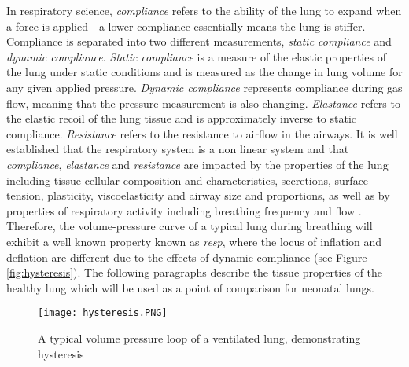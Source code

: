 \documentclass[12pt, openany, oneside]{book}
\begin{document}
In respiratory science, \textit{compliance} refers to the ability of the lung to expand when a force is applied - a lower compliance essentially means the lung is stiffer. Compliance is separated into two different measurements, \textit{static compliance} and \textit{dynamic compliance}. \textit{Static compliance} is a measure of the elastic properties of the lung under static conditions and is measured as the change in lung volume for any given applied pressure. \textit{Dynamic compliance} represents compliance during gas flow, meaning that the pressure measurement is also changing. \textit{Elastance} refers to the elastic recoil of the lung tissue and is approximately inverse to static compliance. \textit{Resistance} refers to the resistance to airflow in the airways. It is well established that the respiratory system is a non linear system and that \textit{compliance}, \textit{elastance} and \textit{resistance} are impacted by the properties of the lung including tissue cellular composition and characteristics, secretions, surface tension, plasticity, viscoelasticity and airway size and proportions, as well as by properties of respiratory activity including breathing frequency and flow \citep{sivieri, respShade, measure}. Therefore, the volume-pressure curve of a typical lung during breathing will exhibit a well known property known as \textit{resp}, where the locus of inflation and deflation are different due to the effects of dynamic compliance (see Figure \ref{fig:hysteresis}). The following paragraphs describe the tissue properties of the healthy lung which will be used as a point of comparison for neonatal lungs.\\


\begin{figure}
	\centering		
	\texttt{[image: hysteresis.PNG]}	
	\caption[Lung hysteresis]{A typical volume pressure loop of a ventilated lung, demonstrating hysteresis \citep{sivieri} }
	\label{fig:resp}
	
\end{figure}

\end{document}
